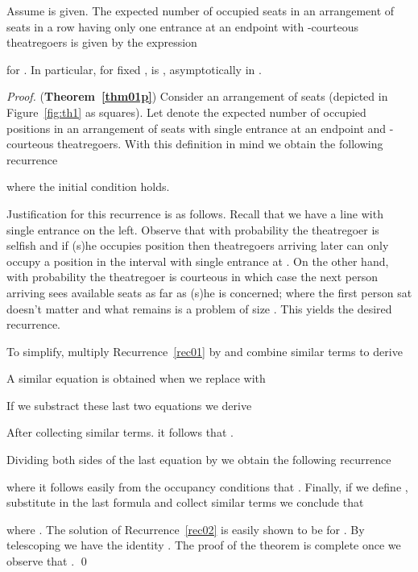 \documentclass[11pt]{llncs}
\begin{document}
\begin{theorem}
\label{thm01p}
Assume  is given.
The
expected number  of occupied seats in an arrangement of  seats
in a row having only one entrance at an endpoint
with -courteous
theatregoers is given by the expression

for . In particular, for fixed ,  is ,
asymptotically in .
\end{theorem}
\begin{proof} ({\bf Theorem~\ref{thm01p}})
Consider an arrangement of  seats (depicted in Figure~\ref{fig:th1} as squares).
Let  denote the expected number of occupied
positions  in an arrangement of  seats
with single entrance 
at an endpoint
and -courteous
theatregoers.
With this definition in mind we obtain the following
recurrence

where the initial condition  holds.

Justification for this recurrence is as follows.
Recall that we have a line
with single entrance on the left. Observe that with probability 
the theatregoer is selfish and if (s)he occupies
position  then theatregoers arriving later
can only occupy a position in the interval 
with single entrance at .
On the other hand, with probability  the theatregoer is courteous
in which case the next person
arriving sees  available seats as 
far as (s)he is concerned; where the first person
sat doesn't matter and what remains is a problem of size .
This
yields the desired recurrence.

To simplify, multiply Recurrence~\eqref{rec01} by 
and combine similar terms to derive

A similar equation is obtained when we replace  with 

If we substract these last two equations
we derive

After collecting similar terms. it follows that 
.

Dividing both sides of the last equation
by  we obtain the following recurrence

where it follows easily from the occupancy conditions that
. 
Finally,
if we define , substitute
in the last formula and collect similar terms
we conclude that

where . The solution of Recurrence~\eqref{rec02}
is easily shown to be  for .
By telescoping we have the identity . The proof of the theorem is complete once we observe that .
\qed
\end{proof}

\begin{comment}
As an immediate corollary,
using the expansion (in the variable ) of the logarithmic
function  in a Taylor series
we derive the following result.

\begin{corollary}
For firxed ,
the
expected number  of occupied seats in an arrangement of  seats
in a row having only one entrance
with probabilistically -courteous
theatregoers is given by the expression

asymptotically in .
\qed
\end{corollary}
\end{comment}
\end{document}
